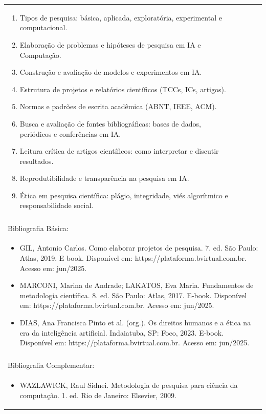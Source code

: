 \documentclass[11pt]{article}
\begin{document}
\begin{center}
\begin{longtable}{|p{4cm}|p{4cm}|p{4cm}|p{4cm}|}
{\begin{enumerate}
\item Tipos de pesquisa: básica, aplicada, exploratória, experimental e computacional.
\item Elaboração de problemas e hipóteses de pesquisa em IA e Computação.
\item Construção e avaliação de modelos e experimentos em IA.
\item Estrutura de projetos e relatórios científicos (TCCs, ICs, artigos).
\item Normas e padrões de escrita acadêmica (ABNT, IEEE, ACM).
\item Busca e avaliação de fontes bibliográficas: bases de dados, periódicos e conferências em IA.
\item Leitura crítica de artigos científicos: como interpretar e discutir resultados.
\item Reprodutibilidade e transparência na pesquisa em IA.
\item Ética em pesquisa científica: plágio, integridade, viés algorítmico e responsabilidade social.\end{enumerate}}\\
\multicolumn{4}{|p{16cm}|}{}\\
\hline
\multicolumn{4}{|p{16cm}|}{Bibliografia Básica:}\\
\multicolumn{4}{|p{\dimexpr 16cm + 6\tabcolsep\relax}|}{%
\begin{itemize}\item GIL, Antonio Carlos. Como elaborar projetos de pesquisa. 7. ed. São Paulo: Atlas, 2019. E-book. Disponível em: https://plataforma.bvirtual.com.br. Acesso em: jun/2025.
\item MARCONI, Marina de Andrade; LAKATOS, Eva Maria. Fundamentos de metodologia científica. 8. ed. São Paulo: Atlas, 2017. E-book. Disponível em: https://plataforma.bvirtual.com.br. Acesso em: jun/2025.
\item DIAS, Ana Francisca Pinto et al. (org.). Os direitos humanos e a ética na era da inteligência artificial. Indaiatuba, SP: Foco, 2023. E-book. Disponível em: https://plataforma.bvirtual.com.br. Acesso em: jun/2025.\end{itemize}}\\
\multicolumn{4}{|p{16cm}|}{}\\
\hline
\multicolumn{4}{|p{16cm}|}{Bibliografia Complementar:}\\
\multicolumn{4}{|p{\dimexpr 16cm + 6\tabcolsep\relax}|}{%
\begin{itemize}\item WAZLAWICK, Raul Sidnei. Metodologia de pesquisa para ciência da computação. 1. ed. Rio de Janeiro: Elsevier, 2009.

\end{itemize}}
\end{longtable}
\end{center}
\end{document}
